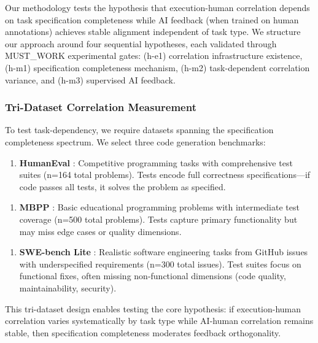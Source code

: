 
Our methodology tests the hypothesis that execution-human correlation depends on task specification completeness while AI feedback (when trained on human annotations) achieves stable alignment independent of task type. We structure our approach around four sequential hypotheses, each validated through MUST\_WORK experimental gates: (h-e1) correlation infrastructure existence, (h-m1) specification completeness mechanism, (h-m2) task-dependent correlation variance, and (h-m3) supervised AI feedback.

\subsubsection{Tri-Dataset Correlation Measurement}

To test task-dependency, we require datasets spanning the specification completeness spectrum. We select three code generation benchmarks:

\begin{enumerate}
\item \textbf{HumanEval} \citep{chen2021evaluating}: Competitive programming tasks with comprehensive test suites (n=164 total problems). Tests encode full correctness specifications---if code passes all tests, it solves the problem as specified.
\end{enumerate}

\begin{enumerate}
\item \textbf{MBPP} \citep{austin2021program}: Basic educational programming problems with intermediate test coverage (n=500 total problems). Tests capture primary functionality but may miss edge cases or quality dimensions.
\end{enumerate}

\begin{enumerate}
\item \textbf{SWE-bench Lite} \citep{jimenez2023swebench}: Realistic software engineering tasks from GitHub issues with underspecified requirements (n=300 total issues). Test suites focus on functional fixes, often missing non-functional dimensions (code quality, maintainability, security).
\end{enumerate}

This tri-dataset design enables testing the core hypothesis: if execution-human correlation varies systematically by task type while AI-human correlation remains stable, then specification completeness moderates feedback orthogonality.

